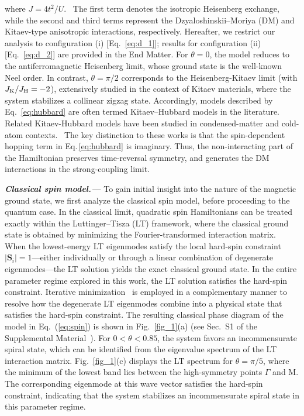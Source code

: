 \documentclass[aps,prl,twocolumn,showpacs,superscriptaddress]{revtex4-2}
\begin{document}
where $J=4t^2/U$.~\cite{macdonald1988t,shekhtman1992moriya} The first term denotes the isotropic Heisenberg exchange, while the second and third terms represent the Dzyaloshinskii–Moriya (DM) and Kitaev-type anisotropic interactions, respectively. Hereafter, we restrict our analysis to configuration (i) [Eq.~\eqref{eq:d_1}]; results for configuration (ii) [Eq.~\eqref{eq:d_2}] are provided in the End Matter. For $\theta = 0$, the model reduces to the antiferromagnetic Heisenberg limit, whose ground state is the well-known Neel order. In contrast, $\theta = \pi/2$ corresponds to the Heisenberg-Kitaev limit (with $J_{\rm K}/J_{\rm H}=-2$), extensively studied in the context of Kitaev materials, where the system stabilizes a collinear zigzag state.\cite{chaloupka2013zigzag,rau2014generic,rousochatzakis2015phase,rau2016spin,hermanns2018physics,3m4m-3v59,schaffer2012quantum} Accordingly, models described by Eq.~\eqref{eq:hubbard} are often termed Kitaev–Hubbard models in the literature. Related Kitaev-Hubbard models have been studied in condensed-matter and cold-atom contexts.~\cite{duan2003controlling,hassan2013quarter,faye2014topological,sato2021quantum,rachel18rpp116501} The key distinction to these works is that the spin-dependent hopping term in Eq.\,\eqref{eq:hubbard} is imaginary. Thus, the non-interacting part of the Hamiltonian preserves time-reversal symmetry, and generates the DM interactions in the strong-coupling limit.

\textbf{\textit{Classical spin model.---}}
To gain initial insight into the nature of the magnetic ground state, we first analyze the classical spin model, before proceeding to the quantum case. In the classical limit, quadratic spin Hamiltonians can be treated exactly within the Luttinger–Tisza (LT) framework, where the classical ground state is obtained by minimizing the Fourier-transformed interaction matrix.~\cite{luttinger1946theory,sklan2013nonplanar,sim2018discovery} When the lowest-energy LT eigenmodes satisfy the local hard-spin constraint $|\mathbf{S}_i| = 1$—either individually or through a linear combination of degenerate eigenmodes—the LT solution yields the exact classical ground state. In the entire parameter regime explored in this work, the LT solution satisfies the hard-spin constraint. Iterative minimization~\cite{sklan2013nonplanar} is employed in a complementary manner to resolve how the degenerate LT eigenmodes combine into a physical state that satisfies the hard-spin constraint. The resulting classical phase diagram of the model in Eq.~(\ref{eq:spin}) is shown in Fig.~\ref{fig_1}(a) (see Sec.~S1 of the Supplemental Material~\cite{supplemental}). For $0 < \theta < 0.85$, the system favors an incommensurate spiral state, which can be identified from the eigenvalue spectrum of the LT interaction matrix. Fig.~\ref{fig_1}(c) displays the LT spectrum for $\theta = \pi/5$, where the minimum of the lowest band lies between the high-symmetry points $\Gamma$ and M. The corresponding eigenmode at this wave vector satisfies the hard-spin constraint, indicating that the system stabilizes an incommensurate spiral state in this parameter regime.
\end{document}
